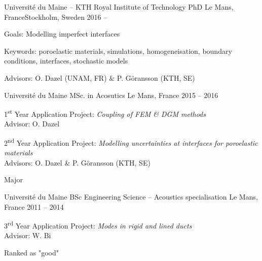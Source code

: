 

\begin{cventries}

  \cventry
    {Université du Maine -- KTH Royal Institute of Technology} %
		{PhD} %
    {Le Mans, France\newline Stockholm, Sweden} %
    {2016 --} %
    {
      \begin{cvitems} %
					\item Goals: Modelling imperfect interfaces
					\item Keywords: poroelastic materials, simulations, homogeneisation, boundary conditions, interfaces, stochastic models
					\item Advisors: O. Dazel (UNAM, FR) \& P. Göransson (KTH, SE)
      \end{cvitems}
    }

  \cventry
    {Université du Maine} %
		{MSc. in Acosutics} %
    {Le Mans, France} %
    {2015 -- 2016} %
    {
      \begin{cvitems} %
				\item {1\textsuperscript{st} Year Application Project: \textit{Coupling of FEM \& DGM methods}\\
					Advisor: O. Dazel}
				\item {2\textsuperscript{nd} Year Application Project: \textit{Modelling uncertainties at interfaces for poroelastic materials}
					\\Advisors: O. Dazel \& P. Göransson (KTH, SE)}
				\item Major
      \end{cvitems}
    }

  \cventry
    {Université du Maine} %
		{BSc Engineering Science -- Acoustics specialisation} %
    {Le Mans, France} %
    {2011 -- 2014} %
    {
      \begin{cvitems} %
				\item {3\textsuperscript{rd} Year Application Project: \textit{Modes in rigid and lined ducts}
					\\Advisor: W. Bi}
        \item {Ranked as "good"}
      \end{cvitems}
    }


\end{cventries}
